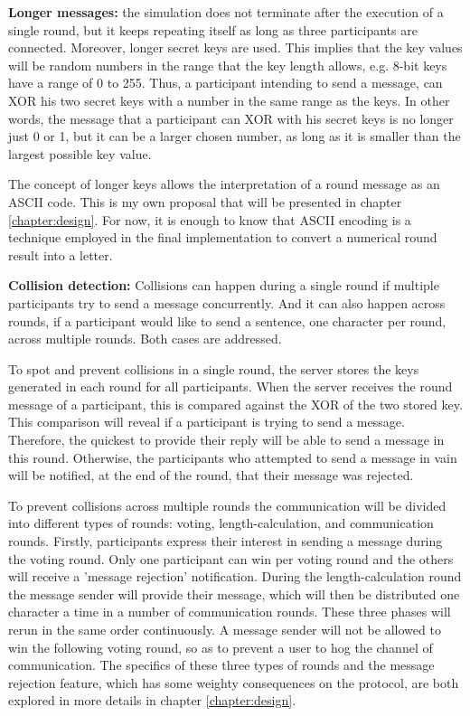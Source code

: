 \textbf{Longer messages:} the simulation does not terminate after the execution of a single round, but it keeps repeating itself as long as three participants are connected. Moreover, longer secret keys are used. This implies that the key values will be random numbers in the range that the key length allows, e.g. 8-bit keys have a range of 0 to 255. Thus, a participant intending to send a message, can XOR his two secret keys with a number in the same range as the keys. In other words, the message that a participant can XOR with his secret keys is no longer just 0 or 1, but it can be a larger chosen number, as long as it is smaller than the largest possible key value. 

The concept of longer keys allows the interpretation of a round message as an ASCII code. This is my own proposal that will be presented in chapter \ref{chapter:design}. For now, it is enough to know that ASCII encoding is a technique employed in the final implementation to convert a numerical round result into a letter. \newline

\textbf{Collision detection:} Collisions can happen during a single round if multiple participants try to send a message concurrently. And it can also happen across rounds, if a participant would like to send a sentence, one character per round, across multiple rounds. Both cases are addressed.

To spot and prevent collisions in a single round, the server stores the keys generated in each round for all participants. When the server receives the round message of a participant, this is compared against the XOR of the two stored key. This comparison will reveal if a participant is trying to send a message. Therefore, the quickest to provide their reply will be able to send a message in this round. Otherwise, the participants who attempted to send a message in vain will be notified, at the end of the round, that their message was rejected. 

To prevent collisions across multiple rounds the communication will be divided into different types of rounds: voting, length-calculation, and communication rounds. Firstly, participants express their interest in sending a message during the voting round. Only one participant can win per voting round and the others will receive a 'message rejection' notification. During the length-calculation round the message sender will provide their message, which will then be distributed one character a time in a number of communication rounds. These three phases will rerun in the same order continuously. A message sender will not be allowed to win the following voting round, so as to prevent a user to hog the channel of communication. The specifics of these three types of rounds and the message rejection feature, which has some weighty consequences on the protocol, are both explored in more details in chapter \ref{chapter:design}.


